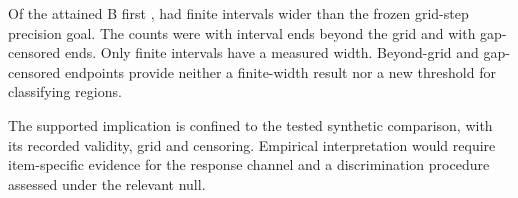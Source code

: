 Of the  attained B first ,  had finite intervals wider than the frozen grid-step precision goal. The counts were   with interval ends beyond the grid and   with gap-censored ends. %
Only finite intervals have a measured width. Beyond-grid and gap-censored endpoints provide neither a finite-width result nor a new threshold for classifying regions. %

The supported implication is confined to the tested synthetic comparison, with its recorded validity, grid and censoring. Empirical interpretation would require item-specific evidence for the response channel and a discrimination procedure assessed under the relevant null. %



